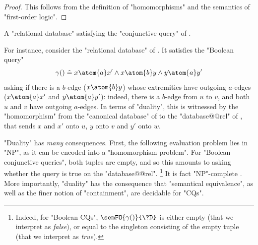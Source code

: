 \begin{proof}
	This follows from the definition of "homomorphisms" and
	the semantics of "first-order logic".
\end{proof}
\begin{marginfigure}
	\centering
	\caption{\AP\label{fig:prelim-db-stupid-ex}
		A "relational database" satisfying the "conjunctive query" of 
		.
	}
\end{marginfigure}
For instance, consider the "relational database" of .
It satisfies the "Boolean query" 
\[
	\gamma() \defeq x \atom{a} x' \land x \atom{b} y \land y \atom{a} y'
\]
asking if there is a $b$-edge ($x \atom{b} y$) whose extremities
have outgoing $a$-edges ($x \atom{a} x'$ and $y \atom{a} y'$):
indeed, there is a $b$-edge from $u$ to $v$, and both $u$ and $v$
have outgoing $a$-edges. In terms of "duality", this is
witnessed by the "homomorphism" from the
"canonical database" of  to the
"database@@rel" of ,
that sends $x$ and $x'$ onto $u$, $y$ onto $v$ and $y'$ onto $w$.

"Duality" has \emph{many} consequences. First, the following evaluation problem
lies in "NP", as it can be encoded into a "homomorphism problem".
For "Boolean conjunctive queries", both tuples are empty, and so
this amounts to asking whether the query is true on the "database@@rel".%
\footnote{Indeed, for "Boolean CQs",
$\semFO{\gamma()}{\?D}$ is either empty (that we interpret as \emph{false}),
or equal to the singleton consisting of the empty tuple (that we interpret as \emph{true}).}
It is fact "NP"-complete \cite[Theorem 7]{ChandraMerlin1977Implementation}.
More importantly, "duality" has the consequence that
"semantical equivalence", as well as the finer notion of "containment",
are decidable for "CQs".

